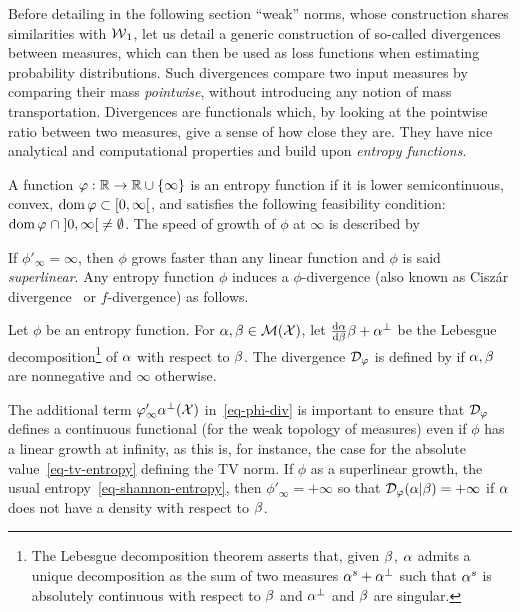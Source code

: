 Before detailing in the following section ``weak'' norms, whose construction shares similarities with $\operatorname{\mathcal{W}}_1$, let us detail a generic construction of so-called divergences between measures, which can then be used as loss functions when estimating probability distributions. Such divergences compare two input measures by comparing their mass \emph{pointwise}, without introducing any notion of mass transportation. Divergences are functionals which, by looking at the pointwise ratio between two measures, give a sense of how close they are. They have nice analytical and computational properties and build  upon \emph{entropy functions}.

\begin{defn}
\label{def_entropy}
A function $\varphi : \mathbb{R} \to \mathbb{R} \cup \{\infty\}$ is an entropy function if it is lower semicontinuous, convex, $\operatorname{dom} \varphi\subset [0,\infty[$, and satisfies the following feasibility condition:  $\operatorname{dom} \varphi \; \cap\;  ]0, \infty[\; \neq \emptyset$. The speed of growth of $\phi$ at $\infty$ is described by %
\end{defn}

If $\phi'_\infty = \infty$, then $\phi$ grows faster than any linear function and $\phi$ is said \emph{superlinear}. Any entropy function $\phi$ induces a $\phi$-divergence (also known as Cisz\'ar divergence~\citep{ciszar1967information,ali1966general} or $f$-divergence) as follows.



\begin{defn}
\label{def_divergence}
Let $\phi$ be an entropy function.
For $\alpha,\beta \in \mathcal{M}(\mathcal{X})$, let $\frac{\mathrm{d} \alpha}{\mathrm{d} \beta} \beta + \alpha^{\perp}$ be the Lebesgue decomposition\footnote{The Lebesgue decomposition theorem asserts that, given $\beta$, $\alpha$ admits a unique decomposition as the sum of two measures $\alpha^s + \alpha^\perp$ such that $\alpha^s$ is absolutely continuous with respect to $\beta$ and $\alpha^\perp$ and $\beta$ are singular.} of $\alpha$ with respect to $\beta$. The divergence $\mathcal{D}_\varphi$ is defined by
if $\alpha,\beta$ are nonnegative and $\infty$ otherwise.
\end{defn}%

The additional term $\varphi'_\infty \alpha^{\perp}(\mathcal{X})$ in~\eqref{eq-phi-div} is important to ensure that $\mathcal{D}_\varphi$ defines a continuous functional (for the weak topology of measures) even if $\phi$ has a linear growth at infinity, as this is, for instance, the case for the absolute value~\eqref{eq-tv-entropy} defining the TV norm. If $\phi$ as a superlinear growth, \eg the usual entropy~\eqref{eq-shannon-entropy}, then $\phi'_\infty=+\infty$ so that $\mathcal{D}_\varphi (\alpha|\beta) = +\infty$ if $\alpha$ does not have a density with respect to $\beta$. 

